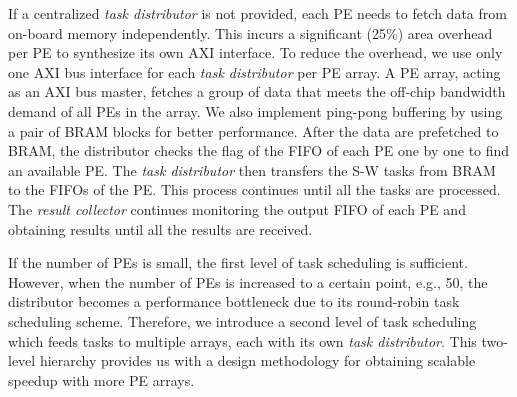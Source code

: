If a centralized \textit{task distributor} is not provided, each PE needs to fetch data from on-board memory independently. 
This incurs a significant (25\%) area overhead per PE to synthesize its own AXI interface. 
To reduce the overhead, we use only one AXI bus interface for each \textit{task distributor} per PE array. 
A PE array, acting as an AXI bus master, fetches a group of data that meets the off-chip bandwidth demand of all PEs in the array. 
We also implement ping-pong buffering by using a pair of BRAM blocks for better performance. 
After the data are prefetched to BRAM, 
the distributor checks the flag of the FIFO of each PE one by one to find an available PE. 
The \textit{task distributor} then transfers the S-W tasks from BRAM to the FIFOs of the PE. 
This process continues until all the tasks are processed.
The \textit{result collector} continues monitoring the output FIFO of each PE and obtaining results until all the results are received.

If the number of PEs is small, the first level of task scheduling is sufficient. 
However, when the number of PEs is increased to a certain point, e.g., 50,  
the distributor becomes a performance bottleneck due to its round-robin task scheduling scheme.
Therefore, we introduce a second level of task scheduling which feeds tasks to multiple arrays, each with its own \textit{task distributor}. 
This two-level hierarchy provides us with a design methodology for obtaining scalable speedup with more PE arrays.
